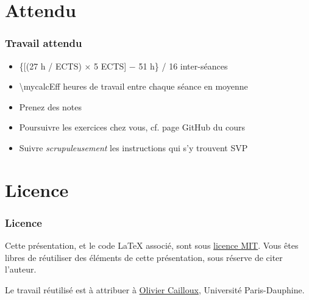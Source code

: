 \documentclass[english, french]{beamer}
\begin{document}
\section{Attendu}
\begin{frame}
	\frametitle{Travail attendu}
	\begin{itemize}
		\item \{[(27 h / ECTS) × 5 ECTS] − 51 h\} / 16 inter-séances
		\item \num[round-mode=places, round-precision=0, mode=text]{\mycalcEff} heures de travail entre chaque séance en moyenne
		\item Prenez des notes
		\item Poursuivre les exercices chez vous, cf. page GitHub du cours
		\item Suivre \emph{scrupuleusement} les instructions qui s’y trouvent SVP
	\end{itemize}
\end{frame}

\appendix
\section{Licence}
\begin{frame}
	\frametitle{Licence}
	Cette présentation, et le code LaTeX associé, sont sous \href{https://opensource.org/licenses/MIT}{licence MIT}. Vous êtes libres de réutiliser des éléments de cette présentation, sous réserve de citer l’auteur.
	
	Le travail réutilisé est à attribuer à \href{http://www.lamsade.dauphine.fr/~ocailloux/}{Olivier Cailloux}, Université Paris-Dauphine.
\end{frame}
\end{document}
